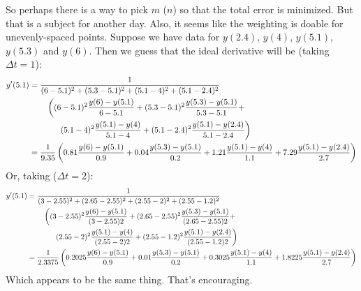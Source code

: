 \documentclass{amsart}
\begin{document}
So perhaps there is a way to pick $m$ ($n$) so that the total error is
minimized.  But that is a subject for another day.  Also, it seems like the
weighting is doable for unevenly-spaced points.  Suppose we have data for
$y(2.4)$, $y(4)$, $y(5.1)$, $y(5.3)$ and $y(6)$.  Then we guess that the
ideal derivative will be (taking $\Delta t = 1$):
\begin{align*}
y'(5.1) & =
  \frac{1}{(6 - 5.1)^2 + (5.3 - 5.1)^2 + (5.1 - 4)^2 + (5.1 - 2.4)^2} \\
& \hspace{0.3in}
  \left( (6 - 5.1)^2 \frac{y(6) - y(5.1)}{6 - 5.1} +
         (5.3 - 5.1)^2 \frac{y(5.3) - y(5.1)}{5.3 - 5.1} + \right. \\
& \hspace{0.5in}
  \left. (5.1 - 4)^2 \frac{y(5.1) - y(4)}{5.1 - 4} +
         (5.1 - 2.4)^2 \frac{y(5.1) - y(2.4)}{5.1 - 2.4} \right) \\
& = \frac{1}{9.35}
  \left( 0.81 \frac{y(6) - y(5.1)}{0.9} +
         0.04 \frac{y(5.3) - y(5.1)}{0.2} +
         1.21 \frac{y(5.1) - y(4)}{1.1} +
         7.29 \frac{y(5.1) - y(2.4)}{2.7} \right)
\end{align*}
Or, taking ($\Delta t = 2$):
\begin{align*}
y'(5.1) & =
  \frac{1}{(3 - 2.55)^2 + (2.65 - 2.55)^2 + (2.55 - 2)^2 + (2.55 - 1.2)^2} \\
& \hspace{0.3in}
  \left( (3 - 2.55)^2 \frac{y(6) - y(5.1)}{(3 - 2.55) 2} +
         (2.65 - 2.55)^2 \frac{y(5.3) - y(5.1)}{(2.65 - 2.55) 2} + \right. \\
& \hspace{0.5in}
  \left. (2.55 - 2)^2 \frac{y(5.1) - y(4)}{(2.55 - 2) 2} +
         (2.55 - 1.2)^2 \frac{y(5.1) - y(2.4)}{(2.55 - 1.2) 2} \right) \\
& = \frac{1}{2.3375}
  \left( 0.2025 \frac{y(6) - y(5.1)}{0.9} +
         0.01 \frac{y(5.3) - y(5.1)}{0.2} +
         0.3025 \frac{y(5.1) - y(4)}{1.1} +
         1.8225 \frac{y(5.1) - y(2.4)}{2.7} \right)
\end{align*}
Which appears to be the same thing.  That's encouraging.
\end{document}

